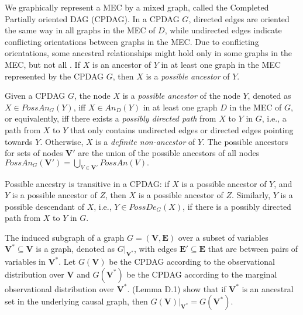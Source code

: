 We  graphically represent a \ac{MEC} by a mixed graph, called the Completed Partially oriented DAG (\ac{CPDAG}).
In a \ac{CPDAG} $G$, directed edges are oriented the same way in all graphs in the \ac{MEC} of $D$, while undirected edges indicate conflicting orientations between graphs in the \ac{MEC}.
Due to conflicting orientations, some ancestral relationships might hold only in some graphs in the \ac{MEC}, but not all \citep{zhang2006causal, roumpelaki2016marginal}.
If $X$ is an ancestor of $Y$ in at least one graph in the \ac{MEC} represented by the CPDAG $G$, then $X$ is a \emph{possible ancestor} of $Y$.

\begin{definition}
\label{def:possan}
Given a \ac{CPDAG} $G$, the node $X$ is a \emph{possible ancestor} of the node $Y$, denoted as $X\in PossAn_G(Y)$, iff $X \in An_D(Y)$ in at least one graph $D$ in the MEC of $G$, or equivalently, iff there exists a \emph{possibly directed path} from $X$ to $Y$ in $G$, i.e., a path from $X$ to $Y$ that only contains undirected edges or directed edges pointing towards $Y$.
Otherwise, $X$ is a \emph{definite non-ancestor} of $Y$.
The possible ancestors for sets of nodes $\mathbf{V}'$ are the union of the possible ancestors of all nodes
$
    PossAn_G(\mathbf{V}') = \bigcup_{V \in \mathbf{V}'} PossAn(V).
$
\end{definition}

Possible ancestry is transitive in a CPDAG: if $X$ is a possible ancestor of $Y$, and $Y$ is a possible ancestor of $Z$, then $X$ is a possible ancestor of $Z$. 
Similarly, $Y$ is a possible descendant of $X$, i.e., $Y \in PossDe_G(X)$, if there is a possibly directed path from $X$ to $Y$ in $G$.

The induced subgraph of a graph $G = (\mathbf{V}, \mathbf{E})$ over a subset of variables $\mathbf{V}^* \subseteq \mathbf{V}$ is a graph, denoted as $G|_{\mathbf{V}^*}$, with edges $\mathbf{E}' \subseteq \mathbf{E}$ that are between pairs of variables in $\mathbf{V}^*$.
Let $G(\mathbf{V})$ be the \ac{CPDAG} according to the observational distribution over $\mathbf{V}$ and $G(\mathbf{V}^*)$ be the CPDAG according to the marginal observational distribution over $\mathbf{V}^*$.
\citet{guo2023variable} (Lemma D.1) show  that if $\mathbf{V}^*$ is an ancestral set in the underlying causal graph, then $G(\mathbf{V})|_{\mathbf{V}^*} = G(\mathbf{V}^*)$.

